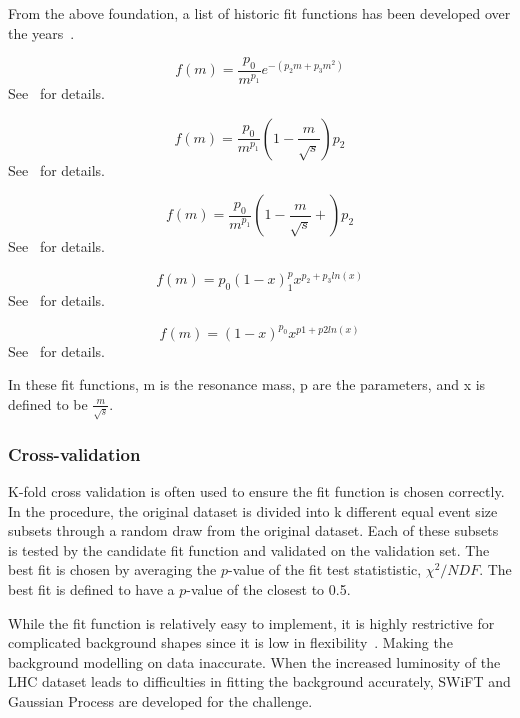 From the above foundation, a list of historic fit functions has been developed over the years~\cite{Pachal:2063032}.

    \begin{equation}
        f(m)=\frac{p_{0}}{m^{p_{1}}}e^{-(p_{2}m+p_{3}m^{2})}
    \end{equation}See~\cite{UA2:1990gao} for details.

    \begin{equation}
        f(m)=\frac{p_{0}}{m^{p_{1}}}(1-\frac{m}{\sqrt{s}})p_{2}
    \end{equation}See~\cite{1995} for details.

    \begin{equation}
        f(m)=\frac{p_{0}}{m^{p_{1}}}(1-\frac{m}{\sqrt{s}}+)p_{2}
    \end{equation}See~\cite{b582dc2d9c234174bfe2adbc9729bf42} for details.

    \begin{equation}
        f(m)=p_{0}(1-x)^p_{1}x^{p_{2}+p_{3}ln(x)}
    \end{equation}See~\cite{2009} for details.

    \begin{equation}
        f(m)=(1-x)^{p_{0}}x^{p1+p2ln(x)}
    \end{equation}See~\cite{2014} for details.

    In these fit functions, m is the resonance mass, p are the parameters, and x is defined to be $\frac{m}{\sqrt{s}}$.

\subsubsection{Cross-validation}
K-fold cross validation is often used to ensure the fit function is chosen correctly. In the procedure, the original dataset is divided into k different equal event size subsets through a random draw from the original dataset. Each of these subsets is tested by the candidate fit function and validated on the validation set. The best fit is chosen by averaging the $p$-value of the fit test statististic, $\chi^{2}/NDF$. The best fit is defined to have a $p$-value of the closest to 0.5.

While the fit function is relatively easy to implement, it is highly restrictive for complicated background shapes since it is low in flexibility~\cite{ATL-PHYS-PUB-2020-028}. Making the background modelling on data inaccurate. When the increased luminosity of the LHC dataset leads to difficulties in fitting the background accurately, SWiFT and Gaussian Process are developed for the challenge. 

